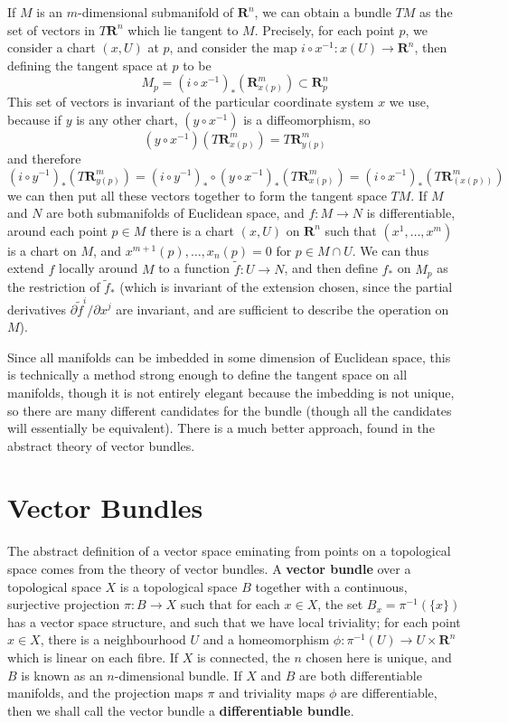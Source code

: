 If $M$ is an $m$-dimensional submanifold of $\mathbf{R}^n$, we can obtain a bundle $TM$ as the set of vectors in $T\mathbf{R}^n$ which lie tangent to $M$. Precisely, for each point $p$, we consider a chart $(x,U)$ at $p$, and consider the map $i \circ x^{-1}: x(U) \to \mathbf{R}^n$, then defining the tangent space at $p$ to be
%
\[ M_p = (i \circ x^{-1})_*\left(\mathbf{R}^m_{x(p)}\right) \subset \mathbf{R}^n_p \]
%
This set of vectors is invariant of the particular coordinate system $x$ we use, because if $y$ is any other chart, $(y \circ x^{-1})$ is a diffeomorphism, so
%
\[ (y \circ x^{-1})(T\mathbf{R}^m_{x(p)}) = T\mathbf{R}^m_{y(p)} \]
%
and therefore
%
\[ (i \circ y^{-1})_*\left(T\mathbf{R}^m_{y(p)}\right) = (i \circ y^{-1})_* \circ (y \circ x^{-1})_* \left( T\mathbf{R}^m_{x(p)} \right) = (i \circ x^{-1})_* \left( T\mathbf{R}^m_{(x(p))} \right) \]
%
we can then put all these vectors together to form the tangent space $TM$. If $M$ and $N$ are both submanifolds of Euclidean space, and $f: M \to N$ is differentiable, around each point $p \in M$ there is a chart $(x,U)$ on $\mathbf{R}^n$ such that $(x^1, \dots, x^m)$ is a chart on $M$, and $x^{m+1}(p), \dots, x_n(p) = 0$ for $p \in M \cap U$. We can thus extend $f$ locally around $M$ to a function $\tilde{f}: U \to N$, and then define $f_*$ on $M_p$ as the restriction of $\tilde{f}_*$ (which is invariant of the extension chosen, since the partial derivatives $\partial \tilde{f}^i/\partial x^j$ are invariant, and are sufficient to describe the operation on $M$).

Since all manifolds can be imbedded in some dimension of Euclidean space, this is technically a method strong enough to define the tangent space on all manifolds, though it is not entirely elegant because the imbedding is not unique, so there are many different candidates for the bundle (though all the candidates will essentially be equivalent). There is a much better approach, found in the abstract theory of vector bundles.

\section{Vector Bundles}

The abstract definition of a vector space eminating from points on a topological space comes from the theory of vector bundles. A {\bf vector bundle} over a topological space $X$ is a topological space $B$ together with a continuous, surjective projection $\pi: B \to X$ such that for each $x \in X$, the set $B_x = \pi^{-1}(\{x\})$ has a vector space structure, and such that we have local triviality; for each point $x \in X$, there is a neighbourhood $U$ and a homeomorphism $\phi: \pi^{-1}(U) \to U \times \mathbf{R}^n$ which is linear on each fibre. If $X$ is connected, the $n$ chosen here is unique, and $B$ is known as an $n$-dimensional bundle. If $X$ and $B$ are both differentiable manifolds, and the projection maps $\pi$ and triviality maps $\phi$ are differentiable, then we shall call the vector bundle a {\bf differentiable bundle}.

